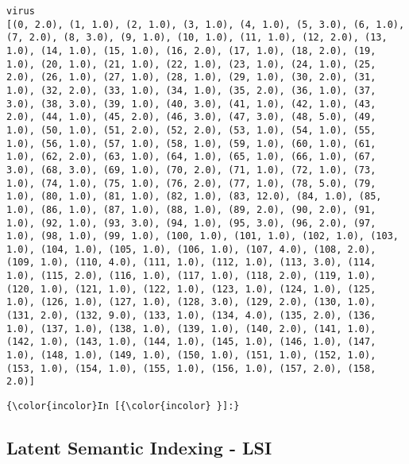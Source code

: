     \begin{Verbatim}[commandchars=\\\{\}]
virus
[(0, 2.0), (1, 1.0), (2, 1.0), (3, 1.0), (4, 1.0), (5, 3.0), (6, 1.0), (7, 2.0), (8, 3.0), (9, 1.0), (10, 1.0), (11, 1.0), (12, 2.0), (13, 1.0), (14, 1.0), (15, 1.0), (16, 2.0), (17, 1.0), (18, 2.0), (19, 1.0), (20, 1.0), (21, 1.0), (22, 1.0), (23, 1.0), (24, 1.0), (25, 2.0), (26, 1.0), (27, 1.0), (28, 1.0), (29, 1.0), (30, 2.0), (31, 1.0), (32, 2.0), (33, 1.0), (34, 1.0), (35, 2.0), (36, 1.0), (37, 3.0), (38, 3.0), (39, 1.0), (40, 3.0), (41, 1.0), (42, 1.0), (43, 2.0), (44, 1.0), (45, 2.0), (46, 3.0), (47, 3.0), (48, 5.0), (49, 1.0), (50, 1.0), (51, 2.0), (52, 2.0), (53, 1.0), (54, 1.0), (55, 1.0), (56, 1.0), (57, 1.0), (58, 1.0), (59, 1.0), (60, 1.0), (61, 1.0), (62, 2.0), (63, 1.0), (64, 1.0), (65, 1.0), (66, 1.0), (67, 3.0), (68, 3.0), (69, 1.0), (70, 2.0), (71, 1.0), (72, 1.0), (73, 1.0), (74, 1.0), (75, 1.0), (76, 2.0), (77, 1.0), (78, 5.0), (79, 1.0), (80, 1.0), (81, 1.0), (82, 1.0), (83, 12.0), (84, 1.0), (85, 1.0), (86, 1.0), (87, 1.0), (88, 1.0), (89, 2.0), (90, 2.0), (91, 1.0), (92, 1.0), (93, 3.0), (94, 1.0), (95, 3.0), (96, 2.0), (97, 1.0), (98, 1.0), (99, 1.0), (100, 1.0), (101, 1.0), (102, 1.0), (103, 1.0), (104, 1.0), (105, 1.0), (106, 1.0), (107, 4.0), (108, 2.0), (109, 1.0), (110, 4.0), (111, 1.0), (112, 1.0), (113, 3.0), (114, 1.0), (115, 2.0), (116, 1.0), (117, 1.0), (118, 2.0), (119, 1.0), (120, 1.0), (121, 1.0), (122, 1.0), (123, 1.0), (124, 1.0), (125, 1.0), (126, 1.0), (127, 1.0), (128, 3.0), (129, 2.0), (130, 1.0), (131, 2.0), (132, 9.0), (133, 1.0), (134, 4.0), (135, 2.0), (136, 1.0), (137, 1.0), (138, 1.0), (139, 1.0), (140, 2.0), (141, 1.0), (142, 1.0), (143, 1.0), (144, 1.0), (145, 1.0), (146, 1.0), (147, 1.0), (148, 1.0), (149, 1.0), (150, 1.0), (151, 1.0), (152, 1.0), (153, 1.0), (154, 1.0), (155, 1.0), (156, 1.0), (157, 2.0), (158, 2.0)]

    \end{Verbatim}

    \begin{Verbatim}[commandchars=\\\{\}]
{\color{incolor}In [{\color{incolor} }]:} 
\end{Verbatim}

    \subsection{Latent Semantic Indexing -
LSI}\label{latent-semantic-indexing---lsi}

